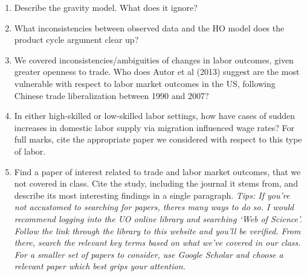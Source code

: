 \documentclass[12pt]{article}
\begin{document}
\begin{enumerate}[1)]
	
	\item Describe the gravity model. What does it ignore?
	
	\vspace{1.6in}
	
	\item What inconsistencies between observed data and the HO model does the product cycle argument clear up?
	
	\vspace{1.6in}
	
	\item We covered inconsistencies/ambiguities of changes in labor outcomes, given greater openness to trade. Who does Autor et al (2013) suggest are the most vulnerable with respect to labor market outcomes in the US, following Chinese trade liberalization between 1990 and 2007? 
	
	\vspace{1.6in}
	
	\newpage
	
	\item In either high-skilled or low-skilled labor settings, how have cases of sudden increases in domestic labor supply via migration influenced wage rates? For full marks, cite the appropriate paper we considered with respect to this type of labor.
	
	\vspace{2in}
	
	\item Find a paper of interest related to trade and labor market outcomes, that we not covered in class. 
	Cite the study, including the journal it stems from, and describe its most interesting findings in a single paragraph.
	{\footnotesize \it Tips: If you're not accustomed to searching for papers, theres many ways to do so. I would recommend logging into the UO online library and searching `Web of Science'. Follow the link through the library to this website and you'll be verified. From there, search the relevant key terms based on what we've covered in our class.
	For a smaller set of papers to consider, use Google Scholar and choose a relevant paper which best grips your attention.}
	
	\vspace{1in}
	
\end{enumerate}
\end{document}

